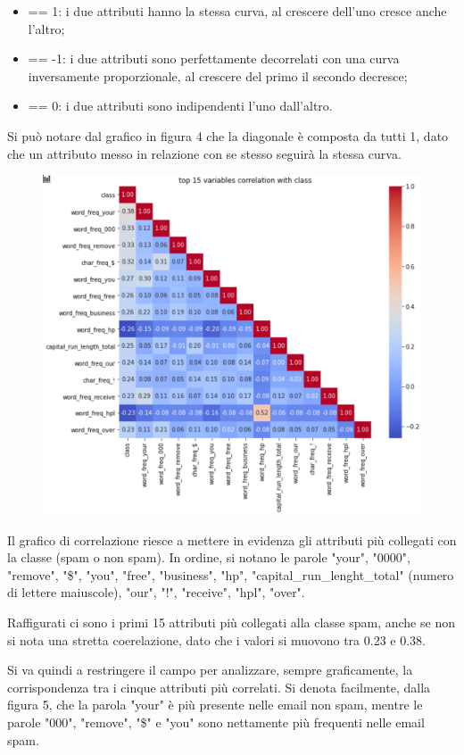 \documentclass[12pt,a4paper]{article}
\begin{document}
\begin{itemize}
\item == 1: i due attributi hanno la stessa curva, al crescere dell'uno cresce anche l'altro;
\item == -1: i due attributi sono perfettamente decorrelati con una curva inversamente proporzionale, al crescere del primo il secondo decresce;
\item == 0: i due attributi sono indipendenti l'uno dall'altro.
\end{itemize}
 Si può notare dal grafico in figura 4 che la diagonale è composta da tutti 1, dato che un attributo messo in relazione con se stesso seguirà la stessa curva.
\begin{figure}[H]
    \centering
    \includegraphics[scale=0.5]{correlation_top_15.png}
    \caption{}
\end{figure}
Il grafico di correlazione riesce a mettere in evidenza gli attributi più collegati con la classe (spam o non spam). In ordine, si notano le parole "your", "0000", "remove", "\$", "you", "free", "business", "hp", "capital\_run\_lenght\_total" (numero di lettere maiuscole), "our", "!", "receive", "hpl", "over".

Raffigurati ci sono i primi 15 attributi più collegati alla classe spam, anche se non si nota una stretta coerelazione, dato che i valori si muovono tra 0.23 e 0.38.

Si va quindi a restringere il campo per analizzare, sempre graficamente, la corrispondenza tra i cinque attributi più correlati. Si denota facilmente, dalla figura 5, che la parola "your" è più presente nelle email non spam, mentre le parole "000", "remove", "\$" e "you" sono nettamente più frequenti nelle email spam.
\end{document}

